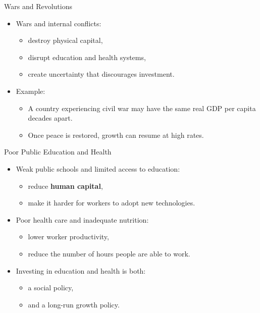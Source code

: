 \documentclass[aspectratio=169]{beamer}
\begin{document}
\begin{frame}{Wars and Revolutions}
\transfade
\begin{itemize}[<+->]
  \item Wars and internal conflicts:
  \begin{itemize}[<+->]
    \item destroy physical capital,
    \item disrupt education and health systems,
    \item create uncertainty that discourages investment.
  \end{itemize}
  \item Example:
  \begin{itemize}[<+->]
    \item A country experiencing civil war may have the same real GDP per capita decades apart.
    \item Once peace is restored, growth can resume at high rates.
  \end{itemize}
\end{itemize}
\end{frame}

\begin{frame}{Poor Public Education and Health}
\transfade
\begin{itemize}[<+->]
  \item Weak public schools and limited access to education:
  \begin{itemize}[<+->]
    \item reduce \textbf{human capital},
    \item make it harder for workers to adopt new technologies.
  \end{itemize}
  \item Poor health care and inadequate nutrition:
  \begin{itemize}[<+->]
    \item lower worker productivity,
    \item reduce the number of hours people are able to work.
  \end{itemize}
  \item Investing in education and health is both:
  \begin{itemize}[<+->]
    \item a social policy,
    \item and a long-run growth policy.
  \end{itemize}
\end{itemize}
\end{frame}
\end{document}
